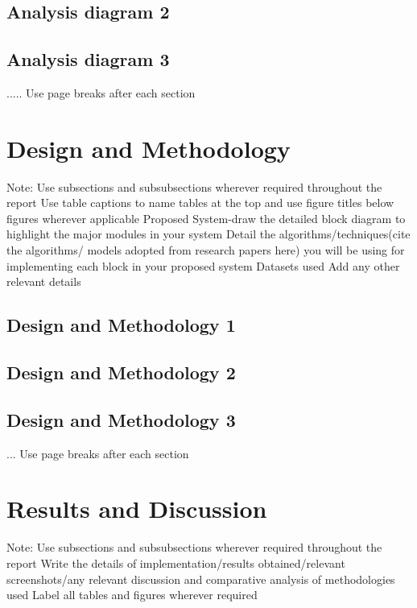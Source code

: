 \documentclass[12pt,singleside,a4paper]{article}
\begin{document}
\subsection{Analysis diagram 2}
\subsection{Analysis diagram 3}
.....
\newline Use page breaks after each section
\section{Design and Methodology}
 Note: Use subsections and subsubsections wherever required throughout the report
\newline Use table captions to name tables at the top and use figure titles below figures wherever applicable 
\newline Proposed System-draw the detailed block diagram to highlight the major modules in your system 
\newline Detail the algorithms/techniques(cite the algorithms/ models adopted from research papers here) you will be using for implementing each block in your proposed system
\newline Datasets used
\newline Add any other relevant details
\subsection{Design and Methodology 1}
\subsection{Design and Methodology 2}
\subsection{Design and Methodology 3}
...
\newline Use page breaks after each section
\section{Results and Discussion}
 Note: Use subsections and subsubsections wherever required throughout the report
\newline Write the details of implementation/results obtained/relevant screenshots/any relevant discussion and comparative analysis of methodologies used
Label all tables and figures wherever required
\end{document}
